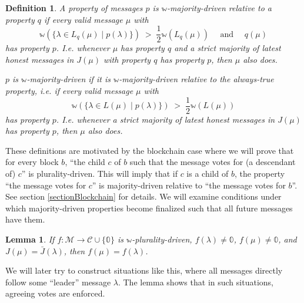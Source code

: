 \documentclass[12pt, fleqn]{article}
\newtheorem{lemma}{Lemma}
\newtheorem{definition}{Definition}
\newcommand{\ww}{\mathbb{w}}
\begin{document}
\begin{definition}
A property of messages $p$ is \emph{$\ww$-majority-driven relative to} a property $q$ if every valid message $\mu$ with
  $$\ww (\{\lambda \in L_q(\mu) \mid p(\lambda) \}) \;>\; \frac{1}{2} \ww(L_q(\mu)) \quad \text{ and } \quad q(\mu)$$
has property $p$. I.e. whenever $\mu$ has property $q$ and a strict majority of latest honest messages in $J(\mu)$ with property $q$ has property $p$, then $\mu$ also does.

$p$ is \emph{$\ww$-majority-driven} if it is $\ww$-majority-driven relative to the always-true property, i.e. if every valid message $\mu$ with
$$\ww (\{\lambda \in L(\mu) \mid p(\lambda) \}) \;>\; \frac{1}{2} \ww(L(\mu))$$
has property $p$. I.e. whenever a strict majority of latest honest messages in $J(\mu)$ has property $p$, then $\mu$ also does.
\end{definition}

These definitions are motivated by the blockchain case where we will prove that for every block $b$, ``the child $c$ of $b$ such that the message votes for (a descendant of) $c$'' is plurality-driven. This will imply that if $c$ is a child of $b$, the property ``the message votes for $c$'' is majority-driven relative to ``the message votes for $b$''. See section \ref{sectionBlockchain} for details. We will examine conditions under which majority-driven properties become finalized such that all future messages have them.

\begin{lemma}\label{leaderLemma}
If $f: \mathcal{M} \rightarrow \mathcal{C} \cup \{ \mathbb{0} \}$ is $\ww$-plurality-driven, $f(\lambda) \neq \mathbb{0}$, $f(\mu) \neq \mathbb{0}$, and $J(\mu) = \bar{J}(\lambda)$, then $f(\mu) = f(\lambda)$.
\end{lemma}

We will later try to construct situations like this, where all messages directly follow some ``leader'' message $\lambda$. The lemma shows that in such situations, agreeing votes are enforced.
\end{document}
